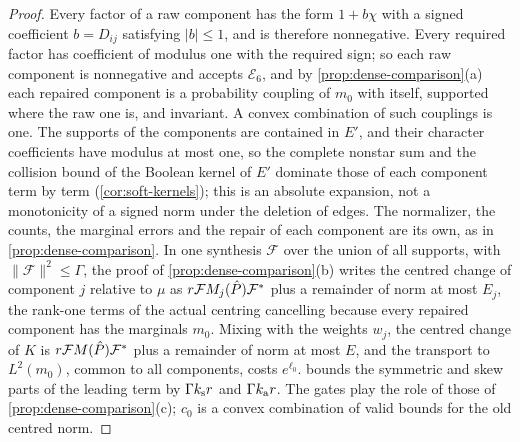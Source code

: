 \begin{proof}
Every factor of a raw component has the form $1+b\chi$ with a
signed coefficient $b=D_{ij}$ satisfying $|b|\le1$, and is therefore
nonnegative. Every required factor has coefficient of modulus one
with the required sign; so each raw component is nonnegative and accepts
$\mathcal E_6$, and by \cref{prop:dense-comparison}(a) each repaired component is a
probability coupling of $m_0$ with itself, supported where the raw one is, and
invariant. A convex combination of such couplings is one. The supports of the
components are contained in $E'$, and their character coefficients have modulus at
most one, so the complete nonstar sum and the collision bound of the Boolean kernel
of $E'$ dominate those of each component term by term (\cref{cor:soft-kernels});
this is an absolute expansion, not a monotonicity of a signed norm under the
deletion of edges. The normalizer, the counts, the marginal errors and the repair
of each component are its own, as in \cref{prop:dense-comparison}. In one synthesis
$\mathcal F$ over the union of all supports, with $\|\mathcal F\|^2\le\Gamma$, the
proof of \cref{prop:dense-comparison}(b) writes the centred change of component $j$
relative to $\mu$ as $r\mathcal FM_j(\hat P)\mathcal F^*$ plus a remainder of norm at
most $E_j$, the rank-one terms of the actual centring cancelling because every
repaired component has the marginals $m_0$. Mixing with the weights $w_j$, the
centred change of $K$ is $r\mathcal FM(\hat P)\mathcal F^*$ plus a remainder of norm at
most $E$, and the transport to $L^2(m_0)$, common to all components, costs
$e^{\ell_0}$.  bounds the symmetric and skew parts of the
leading term by $\Gamma k_{\rm s}r$ and $\Gamma k_{\rm a}r$. The gates play the role
of those of \cref{prop:dense-comparison}(c); $c_0$ is a convex combination of valid
bounds for the old centred norm.
\end{proof}

